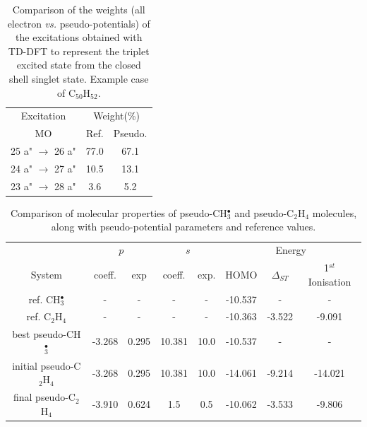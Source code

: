 \documentclass[12pt]{article}
\begin{document}
\newpage

\begin{table}
\begin{tabular}{c c c c}
\hline
\multicolumn{2}{c}{Excitation} & \multicolumn{2}{c}{Weight(\%)}\\
\multicolumn{2}{c}{MO} & Ref. & Pseudo.\\
\hline
\multicolumn{2}{c}{25 a" \(\rightarrow\) 26 a"} & 77.0 &   67.1  \\
\multicolumn{2}{c}{24 a" \(\rightarrow\) 27 a"} & 10.5 &   13.1  \\
\multicolumn{2}{c}{23 a" \(\rightarrow\) 28 a"} & 3.6  &    5.2  \\
\hline
\end{tabular}
\caption{\label{tab:coef}Comparison of the weights (all electron \emph{vs.} pseudo-potentials)
of the excitations obtained with TD-DFT
to represent the triplet excited state from the closed shell singlet state.
Example case of C$_{50}$H$_{52}$.}
\end{table}

\newpage

\begin{table}
\begin{tabular}{c | c c c c | c c c}
 & \multicolumn{2}{c}{$p$} & \multicolumn{2}{c}{$s$} & \multicolumn{3}{c}{Energy} \\
System & coeff. & exp & coeff. & exp. & HOMO & $\Delta_{ST}$ & 1$^{st}$ Ionisation \\
\hline\hline
ref. CH$^{\bullet}_{3}$ & - & - & - & - & -10.537 & - & - \\
\hline
ref. C$_{2}$H$_{4}$ & - & - & - & - & -10.363 & -3.522 & -9.091 \\
\hline
best pseudo-CH$^{\bullet}_{3}$ & -3.268 & 0.295 & 10.381 & 10.0 & -10.537 & - & - \\
\hline
initial pseudo-C$_{2}$H$_{4}$ & -3.268 & 0.295 & 10.381 & 10.0 & -14.061 & -9.214 & -14.021\\
\hline
final pseudo-C$_{2}$H$_{4}$ & -3.910 & 0.624 & 1.5 & 0.5 & -10.062 & -3.533 & -9.806 \\
\hline
\end{tabular}
\caption{\label{table:potential_params} Comparison of molecular properties of pseudo-CH$^{\bullet}_{3}$ and pseudo-C$_{2}$H$_{4}$ molecules, along with pseudo-potential parameters and reference values.}
\end{table}
\end{document}
